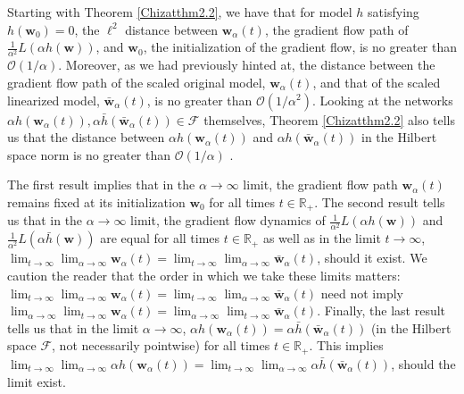 \documentclass{article}
\begin{document}
Starting with Theorem \ref{Chizatthm2.2}, we have that for model $h$ satisfying $h(\boldsymbol{w}_0) = 0$, the $\ell^2$ distance between $\boldsymbol{w}_{\alpha}(t)$, the gradient flow path of $\frac{1}{\alpha^2} L(\alpha h(\boldsymbol{w}))$, and $\boldsymbol{w}_0$, the initialization of the gradient flow, is no greater than $\mathcal{O}(1/\alpha)$. Moreover, as we had previously hinted at, the distance between the gradient flow path of the scaled original model, $\boldsymbol{w}_{\alpha}(t)$, and that of the scaled linearized model, $\boldsymbol{\bar{w}}_{\alpha}(t)$, is no greater than $\mathcal{O}(1/\alpha^2)$. Looking at the networks $\alpha h(\boldsymbol{w}_{\alpha}(t)), \alpha \bar{h}(\boldsymbol{\bar{w}}_{\alpha}(t)) \in \mathcal{F}$ themselves, Theorem \ref{Chizatthm2.2} also tells us that the distance between $\alpha h(\boldsymbol{w}_{\alpha}(t))$ and $\alpha h(\boldsymbol{\bar{w}}_{\alpha}(t))$ in the Hilbert space norm is no greater than $\mathcal{O}(1/\alpha)$ \cite{chizat2018lazy}. 

The first result implies that in the $\alpha \rightarrow \infty$ limit, the gradient flow path $\boldsymbol{w}_{\alpha}(t)$ remains fixed at its initialization $\boldsymbol{w}_0$ for all times $t \in \mathbb{R}_+$. The second result tells us that in the $\alpha \rightarrow \infty$ limit, the gradient flow dynamics of $\frac{1}{\alpha^2} L(\alpha h(\boldsymbol{w}))$ and $\frac{1}{\alpha^2} L(\alpha \bar{h}(\boldsymbol{w}))$ are equal for all times $t \in \mathbb{R}_+$ as well as in the limit $t \rightarrow \infty$, $\lim_{t \to \infty} \lim_{\alpha \to \infty} \boldsymbol{w}_{\alpha}(t) = \lim_{t \to \infty} \lim_{\alpha \to \infty} \boldsymbol{\bar{w}}_{\alpha}(t)$, should it exist. We caution the reader that the order in which we take these limits matters: $\lim_{t \to \infty} \lim_{\alpha \to \infty} \boldsymbol{w}_{\alpha}(t) = \lim_{t \to \infty} \lim_{\alpha \to \infty} \boldsymbol{\bar{w}}_{\alpha}(t)$ need not imply $\lim_{\alpha \to \infty} \lim_{t \to \infty} \boldsymbol{w}_{\alpha}(t) = \lim_{\alpha \to \infty} \lim_{t \to \infty} \boldsymbol{\bar{w}}_{\alpha}(t)$. Finally, the last result tells us that in the limit $\alpha \rightarrow \infty$, $\alpha h(\boldsymbol{w}_{\alpha}(t)) = \alpha \bar{h}(\boldsymbol{\bar{w}}_{\alpha}(t))$ (in the Hilbert space $\mathcal{F}$, not necessarily pointwise) for all times $t \in \mathbb{R}_+$. This implies $\lim_{t \to \infty} \lim_{\alpha \to \infty} \alpha h(\boldsymbol{w}_{\alpha}(t)) = \lim_{t \to \infty} \lim_{\alpha \to \infty} \alpha \bar{h}(\boldsymbol{\bar{w}}_{\alpha}(t))$, should the limit exist.
\end{document}
